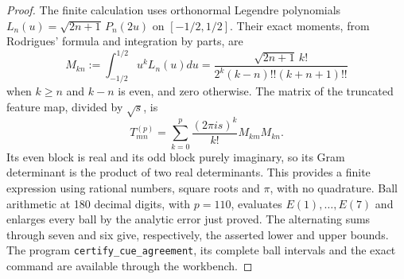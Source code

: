 \begin{proof}
The finite calculation uses orthonormal Legendre polynomials
$L_n(u)=\sqrt{2n+1}\,P_n(2u)$ on $[-1/2,1/2]$. Their exact
moments, from Rodrigues' formula and integration by parts, are
\[
 M_{kn}:=\int_{-1/2}^{1/2}u^kL_n(u)du
 =\frac{\sqrt{2n+1}\,k!}
        {2^k(k-n)!!(k+n+1)!!}
\]
when $k\ge n$ and $k-n$ is even, and zero otherwise.
The matrix of the truncated feature map, divided by $\sqrt s$, is
\[
 T^{(p)}_{mn}=\sum_{k=0}^p
                 \frac{(2\pi is)^k}{k!}M_{km}M_{kn}.
\]
Its even block is real and its odd block purely imaginary, so its
Gram determinant is the product of two real determinants. This
provides a finite expression using rational numbers, square roots
and $\pi$, with no quadrature. Ball arithmetic at 180 decimal digits,
with $p=110$, evaluates $E(1),\ldots,E(7)$ and enlarges every ball
by the analytic error just proved. The alternating sums through
seven and six give, respectively, the asserted lower and upper
bounds. The program \texttt{certify\_cue\_agreement}, its complete
ball intervals and the exact command are available through the
workbench.
\end{proof}

